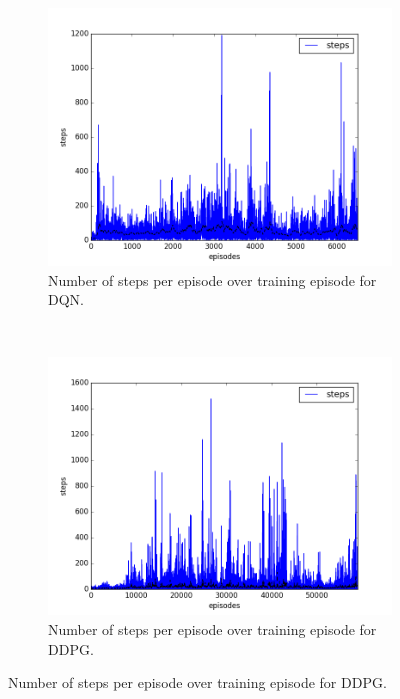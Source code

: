 \begin{figure}[h]
  \centering

  \begin{subfigure}[h]{\figscale\linewidth}
    \includegraphics[trim=10 10 10 10,clip,width=\linewidth]
    {../results/dqn_1vs2/steps.png}
    \caption{Number of steps per episode over training episode for DQN.}
    \label{fig:dqn-1vs2-steps}
  \end{subfigure}
  ~
  \begin{subfigure}[h]{\figscale\linewidth}
    \includegraphics[trim=10 10 10 10,clip,width=\linewidth]
    {../results/ddpg_1vs2/steps.png}
    \caption{Number of steps per episode over training episode for DDPG.}
    \label{fig:ddpg-1vs2-steps}

\end{subfigure}
\end{figure}
